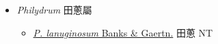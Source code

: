 
  \begin{itemize}
 \item[] \textit{Philydrum} 田蔥屬
                                
  \begin{itemize}
        \item[] \href{http://www.theplantlist.org/tpl1.1/search?q=Philydrum+lanuginosum}{\textit{P. lanuginosum} Banks \& Gaertn.}   田蔥   NT
  \end{itemize}
  \end{itemize}
